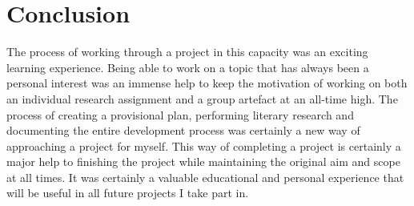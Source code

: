 \section{Conclusion}
The process of working through a project in this capacity was an exciting learning experience. Being able to work on a topic that has always been a personal interest was an immense help to keep the motivation of working on both an individual research assignment and a group artefact at an all-time high. The process of creating a provisional plan, performing literary research and documenting the entire development process was certainly a new way of approaching a project for myself. This way of completing a project is certainly a major help to finishing the project while maintaining the original aim and scope at all times. It was certainly a valuable educational and personal experience that will be useful in all future projects I take part in. 
